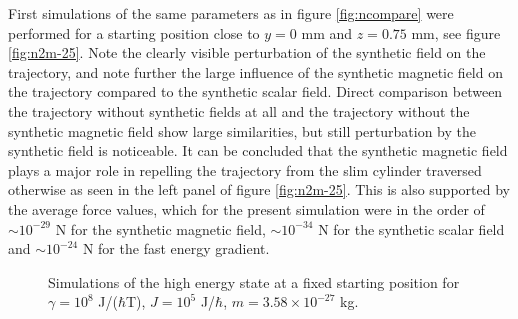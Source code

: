\documentclass[main.tex]{subfiles}
\begin{document}
First simulations of the same parameters as in figure \ref{fig:ncompare} were performed for
a starting position close to \(y=0\) mm and \(z = 0.75\) mm, see figure
\ref{fig:n2m-25}. Note the clearly visible perturbation of the synthetic field on the trajectory,
and note further the large influence of the synthetic magnetic field on the trajectory
compared to the synthetic scalar field. Direct comparison between the trajectory without
synthetic fields at all and the trajectory without the synthetic magnetic field show large
similarities, but still perturbation by the synthetic field is noticeable. It can be
concluded that the synthetic magnetic field plays a major role in repelling the trajectory
from the slim cylinder traversed otherwise as seen in the left panel of figure \ref{fig:n2m-25}. This is also
supported by the average force values, which for the present simulation were in the order
of \(\sim 10^{-29}\) N for the synthetic magnetic field, \(\sim 10^{-34}\) N for the synthetic
scalar field and \(\sim 10^{-24}\) N for the fast energy gradient.

\begin{figure}[h]
    \centering
    \qquad
    \caption{\centering Simulations of the high energy state at a fixed starting position for \(\gamma
    = 10^{8}\) J/(\(\hbar{}\)T), \(J= 10^{5}\) J/\(\hbar{}\), \(m = 3.58\times 10^{-27}\) kg.}%
    \label{fig:n2m-27A}
\end{figure}
\end{document}

